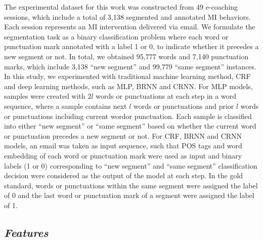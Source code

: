 \documentclass{amia}
\begin{document}
The experimental dataset for this work was constructed from 49 e-coaching sessions, which include a total of 3,138 segmented and annotated MI behaviors. Each session represents an MI intervention delivered via email. We formulate the segmentation task as a binary classification problem where each word or punctuation mark annotated with a label 1 or 0, to indicate whether it precedes a new segment or not. In total, we obtained 95,777 words and 7,140 punctuation marks, which include 3,138 ``new segment'' and 99,779 ``same segment'' instances. In this study, we experimented with traditional machine learning method, CRF and deep learning methods, such as MLP, BRNN and CRNN. For MLP models, samples were created with $2l$ words or punctuations at each step in a word sequence, where a sample contains next $l$ words or punctuations and prior $l$ words or punctuations including current wordor punctuation. Each sample is classified into either ``new segment'' or ``same segment'' based on whether the current word or punctuation precedes a new segment or not. For CRF, BRNN and CRNN models, an email was taken as input sequence, such that POS tags and word embedding of each word or punctuation mark were used as input and binary labels (1 or 0) corresponding to ``new segment'' and ``same segment'' classification decision were considered as the output of the model at each step. In the gold standard, words or punctuations within the same segment were assigned the label of 0 and the last word or punctuation mark of a segment were assigned the label of 1.     

\subsection*{\textit{Features}}
\end{document}
